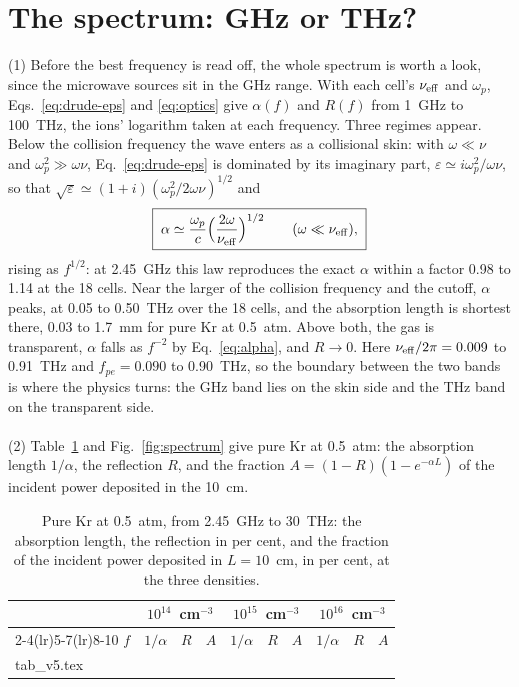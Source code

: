 \documentclass[11pt]{article}
\makeatletter
\numberwithin{equation}{section}
\newcommand{\tabinput}[1]{\@@input #1 }
\newcommand{\nueff}{\nu_{\rm eff}}
\makeatother
\begin{document}
\section{The spectrum: GHz or THz?}
\label{sec:spectrum}
{\noindent}(1) Before the best frequency is read off, the whole spectrum is worth a look, since
the microwave sources sit in the GHz range. With each cell's $\nueff$ and $\omega_p$,
Eqs.~\eqref{eq:drude-eps} and \eqref{eq:optics} give $\alpha(f)$ and $R(f)$ from 1~GHz to
100~THz, the ions' logarithm taken at each frequency. Three regimes appear. Below the collision
frequency the wave enters as a collisional skin: with $\omega\ll\nu$ and
$\omega_p^2\gg\omega\nu$, Eq.~\eqref{eq:drude-eps} is dominated by its imaginary part,
$\varepsilon\simeq i\omega_p^2/\omega\nu$, so that
$\sqrt\varepsilon\simeq(1+i)(\omega_p^2/2\omega\nu)^{1/2}$ and
\begin{equation}
\boxed{\;\alpha\simeq\frac{\omega_p}{c}\Big(\frac{2\omega}{\nueff}\Big)^{1/2}\qquad(\omega\ll\nueff),\;}
\label{eq:skin}
\end{equation}
rising as $f^{1/2}$: at 2.45~GHz this law reproduces the exact $\alpha$ within a factor 0.98 to
1.14 at the 18 cells. Near the larger of the collision frequency and the cutoff, $\alpha$ peaks, at
0.05 to 0.50~THz over the 18 cells, and the absorption length is shortest there, 0.03 to 1.7~mm for
pure Kr at 0.5~atm. Above both, the gas is transparent, $\alpha$ falls as $f^{-2}$ by
Eq.~\eqref{eq:alpha}, and $R\to0$. Here $\nueff/2\pi=0.009$ to 0.91~THz and
$f_{pe}=0.090$ to 0.90~THz, so the boundary between the two bands is where the physics turns:
the GHz band lies on the skin side and the THz band on the transparent side.
\\ \\
{\noindent}(2) Table~\ref{tab:spectrum} and Fig.~\ref{fig:spectrum} give pure Kr at 0.5~atm:
the absorption length $1/\alpha$, the reflection $R$, and the fraction
$A=(1-R)(1-e^{-\alpha L})$ of the incident power deposited in the 10~cm.

\begin{table}[ht]
\centering
\caption{Pure Kr at 0.5~atm, from 2.45~GHz to 30~THz: the absorption length, the reflection in
per cent, and the fraction of the incident power deposited in $L=10$~cm, in per cent, at the
three densities.}
\label{tab:spectrum}
\small
\setlength{\tabcolsep}{4.5pt}
\begin{tabular}{lccccccccc}
\toprule
 & \multicolumn{3}{c}{$10^{14}$~cm$^{-3}$} & \multicolumn{3}{c}{$10^{15}$~cm$^{-3}$} & \multicolumn{3}{c}{$10^{16}$~cm$^{-3}$}\\
\cmidrule(lr){2-4}\cmidrule(lr){5-7}\cmidrule(lr){8-10}
$f$ & $1/\alpha$ & $R$ & $A$ & $1/\alpha$ & $R$ & $A$ & $1/\alpha$ & $R$ & $A$\\
\midrule
\tabinput{tab_v5.tex}
\bottomrule
\end{tabular}
\end{table}
\end{document}
